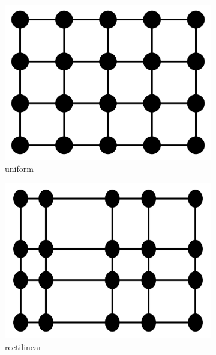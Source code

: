\begin{figure}
\begin{subfigure}[b]{0.2\textwidth}
    \includegraphics[clip=true, width=\textwidth]{Images/uniform.pdf}
    \caption{uniform}
    \label{fig:uniform}
  \end{subfigure}
  \begin{subfigure}[b]{0.2\textwidth}
    \includegraphics[clip=true, width=\textwidth]{Images/rectilinear.pdf}
    \caption{rectilinear}
    \label{fig:rectilinear}
  \end{subfigure}
  \begin{subfigure}[b]{0.19\textwidth}

\end{subfigure}
\end{figure}
